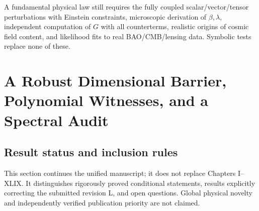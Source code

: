 \documentclass[11pt,a4paper,oneside]{book}
\begin{document}
A fundamental physical law still requires the fully coupled scalar/vector/tensor perturbations with Einstein constraints, microscopic derivation of $\beta,\lambda$, independent computation of $G$ with all counterterms, realistic origins of cosmic field content, and likelihood fits to real BAO/CMB/lensing data. Symbolic tests replace none of these.

\chapter{A Robust Dimensional Barrier, Polynomial Witnesses, and a Spectral Audit}
\section{Result status and inclusion rules}
This section continues the unified manuscript; it does not replace Chapters I--XLIX. It distinguishes rigorously proved conditional statements, results explicitly correcting the submitted revision L, and open questions. Global physical novelty and independently verified publication priority are not claimed.
\end{document}
